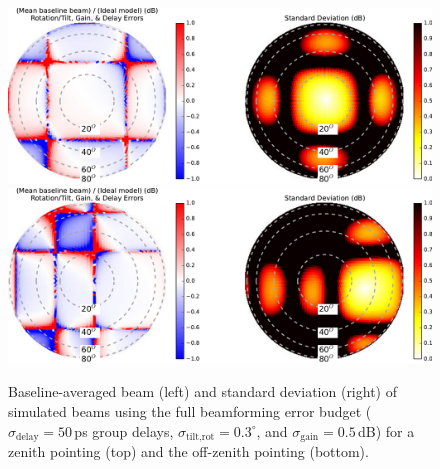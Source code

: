 \begin{figure}[t]
\centering
\includegraphics[width=6in]{chap2_beamforming_errors/groupdelays50psgains0_5dBthetaall0_3deg_baselinemean_and_std_power_beamzenith-eps-converted-to.pdf}
\includegraphics[width=6in]{chap2_beamforming_errors/groupdelays50psgains0_5dBthetaall0_3deg_baselinemean_and_std_power_beamoffzenith-eps-converted-to.pdf}
\caption[Baseline-averaged beam (left) and standard deviation (right) of simulated beams using the full beamforming error budget.]{Baseline-averaged beam (left) and standard deviation (right) of simulated beams using the full beamforming error budget ($\sigma_\text{delay}=50$\,ps group delays, $\sigma_\text{tilt,rot}=0.3^\circ$, and $\sigma_\text{gain}=0.5$\,dB) for a zenith pointing (top) and the off-zenith pointing (bottom). }
\label{fig:simall}
\end{figure}

